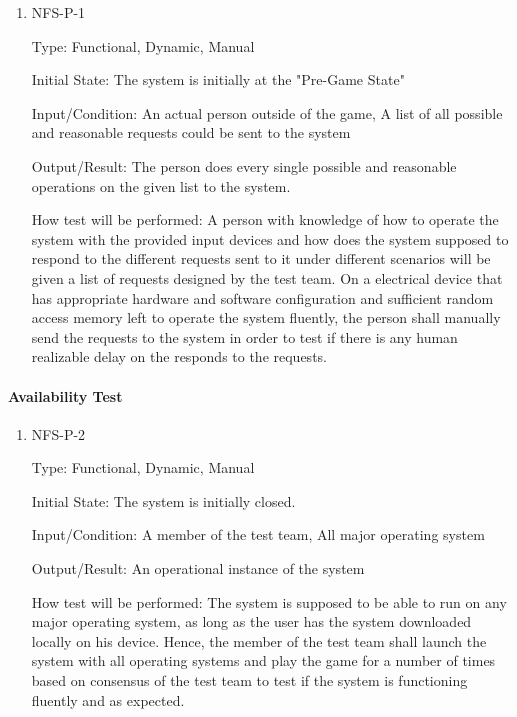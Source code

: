 \documentclass[12pt, titlepage]{article}
\begin{document}
\begin{enumerate}

\item{NFS-P-1\\}

Type: Functional, Dynamic, Manual
					
Initial State: The system is initially at the "Pre-Game State"
					
Input/Condition: An actual person outside of the game, A list of all possible and reasonable requests could be sent to the system 
					
Output/Result: The person does every single possible and reasonable operations on the given list to the system.
					
How test will be performed: A person with knowledge of how to operate the system with the provided input devices and how does the system supposed to respond to the different requests sent to it under different scenarios will be given a list of requests designed by the test team. On a electrical device that has appropriate hardware and software configuration and sufficient random access memory left to operate the system fluently, the person shall manually send the requests to the system in order to test if there is any human realizable delay on the responds to the requests.  

\end{enumerate}

\paragraph{Availability Test}

\begin{enumerate}

\item{NFS-P-2\\}

Type: Functional, Dynamic, Manual
					
Initial State: The system is initially closed.
					
Input/Condition: A member of the test team, All major operating system
					
Output/Result: An operational instance of the system
					
How test will be performed: The system is supposed to be able to run on any major operating system, as long as the user has the system downloaded locally on his device. Hence, the member of the test team shall launch the system with all operating systems and play the game for a number of times based on consensus of the test team to test if the system is functioning fluently and as expected.

\end{enumerate}
\end{document}
